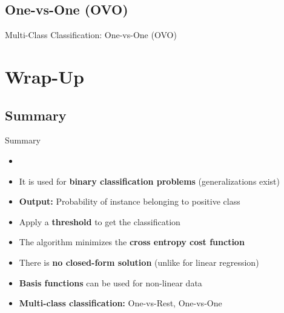 \subsection{One-vs-One (OVO)}

\begin{frame}{Multi-Class Classification: One-vs-One (OVO)}{}
\end{frame}


\section{Wrap-Up}

\subsection{Summary}

\begin{frame}{Summary}{}
	\begin{itemize}
		\item {}
		\item It is used for \textbf{binary classification problems} (generalizations exist)
		\item \textbf{Output:} Probability of instance belonging to positive class
		\item Apply a \textbf{threshold} to get the classification
		\item The algorithm minimizes the \textbf{cross entropy cost function}
		\item There is \textbf{no closed-form solution} (unlike for linear regression)
		\item \textbf{Basis functions} can be used for non-linear data
		\item \textbf{Multi-class classification:} One-vs-Rest, One-vs-One
	\end{itemize}
\end{frame}


